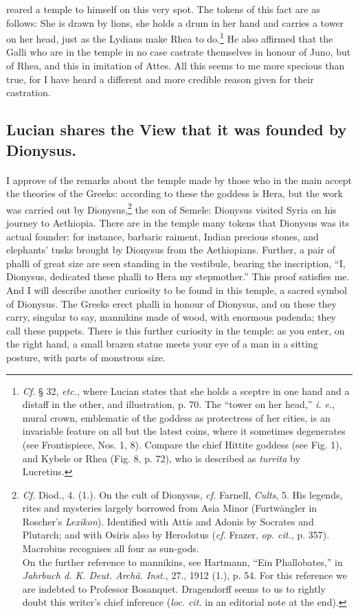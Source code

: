 \documentclass[a4paper, 11pt, oneside, polutonikogreek, english]{article}
\begin{document}
reared a temple to himself on this very spot. The tokens of this fact are as follows: She is drawn by lions, she holds a drum in her hand and carries a tower on her head, just as the Lydians make Rhea to do.\footnote{\emph{Cf.} § 32, \emph{etc.}, where Lucian states that she holds a sceptre in one hand and a distaff in the other, and illustration, p. 70. The ``tower on her head,'' \emph{i. e.}, mural crown, emblematic of the goddess as protectress of her cities, is an invariable feature on all but the latest coins, where it sometimes degenerates (see Frontispiece, Nos. 1, 8). Compare the chief Hittite goddess (see Fig. 1), and Kybele or Rhea (Fig. 8, p. 72), who is described as \emph{turrita} by Lucretius.} He also affirmed that the Galli who are in the temple in no case castrate themselves in honour of Juno, but of Rhea, and this in imitation of Attes. All this seems to me more specious than true, for I have heard a different and more credible reason given for their castration.

\subsection{Lucian shares the View that it was founded by Dionysus.}
\paragraph{}
I approve of the remarks about the temple made by those who in the main accept the theories of the Greeks: according to these the goddess is Hera, but the work was carried out by Dionysus,\footnote{\emph{Cf.} Diod., 4. (1.). On the cult of Dionysus, \emph{cf.} Farnell, \emph{Cults}, 5. His legends, rites and mysteries largely borrowed from Asia Minor (Furtwängler in Roscher's \emph{Lexikon}). Identified with Attis and Adonis by Socrates and Plutarch; and with Osiris also by Herodotus (\emph{cf.} Frazer, \emph{op. cit.}, p. 357). Macrobius recognises all four as sun-gods.\\\hspace*{5mm}On the further reference to mannikins, see Hartmann, ``Ein Phallobates,'' in \emph{Jahrbuch d. K. Deut. Archä. Inst.}, 27., 1912 (1.), p. 54. For this reference we are indebted to Professor Bosanquet. Dragendorff seems to us to rightly doubt this writer's chief inference (\emph{loc. cit.} in an editorial note at the end).} the son of Semele: Dionysus visited Syria on his journey to Aethiopia. There are in the temple many tokens that Dionysus was its actual founder: for instance, barbaric raiment, Indian precious stones, and elephants' tusks brought by Dionysus from the Aethiopians. Further, a pair of phalli of great size are seen standing in the vestibule, bearing the inscription, ``I, Dionysus, dedicated these phalli to Hera my stepmother.'' This proof satisfies me. And I will describe another curiosity to be found in this temple, a sacred symbol of Dionysus. The Greeks erect phalli in honour of Dionysus, and on these they carry, singular to say, mannikins made of wood, with enormous pudenda; they call these puppets. There is this further curiosity in the temple: as you enter, on the right hand, a small brazen statue meets your eye of a man in a sitting posture, with parts of monstrous size.
\end{document}
